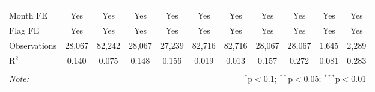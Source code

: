 \begin{table}[!htbp]
\begin{tabular}{@{\extracolsep{1pt}}lcccccccccc}
  & & & & & & & & & & \\ 
\hline \\[-1.8ex] 
Month FE & Yes & Yes & Yes & Yes & Yes & Yes & Yes & Yes & Yes & Yes \\ 
Flag FE & Yes & Yes & Yes & Yes & Yes & Yes & Yes & Yes & Yes & Yes \\ 
Observations & 28,067 & 82,242 & 28,067 & 27,239 & 82,716 & 82,716 & 28,067 & 28,067 & 1,645 & 2,289 \\ 
R$^{2}$ & 0.140 & 0.075 & 0.148 & 0.156 & 0.019 & 0.013 & 0.157 & 0.272 & 0.081 & 0.283 \\ 
\hline 
\hline \\[-1.8ex] 
\textit{Note:}  & \multicolumn{10}{r}{$^{*}$p$<$0.1; $^{**}$p$<$0.05; $^{***}$p$<$0.01} \\ 
\end{tabular} 
\end{table} 
